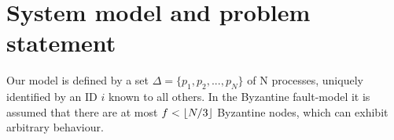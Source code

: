 \section{System model and problem statement}
\label{system-model}



Our model is defined by a set $\Delta=\{p_1, p_2,...,p_N\}$ of N processes, uniquely identified by an ID $i$ known to all others. In the Byzantine fault-model it is assumed that there are at most $f < \lfloor N/3\rfloor$ Byzantine nodes, which can exhibit arbitrary behaviour. 

